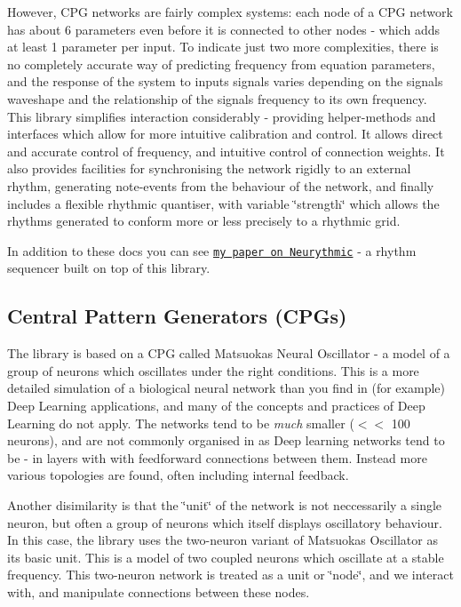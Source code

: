 However, C\+PG networks are fairly complex systems\+: each node of a C\+PG network has about 6 parameters even before it is connected to other nodes -\/ which adds at least 1 parameter per input. To indicate just two more complexities, there is no completely accurate way of predicting frequency from equation parameters, and the response of the system to inputs signals varies depending on the signal\textquotesingle{}s waveshape and the relationship of the signal\textquotesingle{}s frequency to its own frequency. ~\newline
 This library simplifies interaction considerably -\/ providing helper-\/methods and interfaces which allow for more intuitive calibration and control. It allows direct and accurate control of frequency, and intuitive control of connection weights. It also provides facilities for synchronising the network rigidly to an external rhythm, generating note-\/events from the behaviour of the network, and finally includes a flexible rhythmic quantiser, with variable \char`\"{}strength\char`\"{} which allows the rhythms generated to conform more or less precisely to a rhythmic grid.

In addition to these docs you can see \href{http://www.nime.org/proceedings/2018/nime2018_paper0047.pdf}{\tt my paper on Neurythmic} -\/ a rhythm sequencer built on top of this library.

\subsection*{Central Pattern Generators (C\+P\+Gs)}

The library is based on a C\+PG called Matsuoka\textquotesingle{}s Neural Oscillator -\/ a model of a group of neurons which oscillates under the right conditions. This is a more detailed simulation of a biological neural network than you find in (for example) Deep Learning applications, and many of the concepts and practices of Deep Learning do not apply. The networks tend to be {\itshape much} smaller ($<$$<$ 100 neurons), and are not commonly organised in as Deep learning networks tend to be -\/ in layers with with feedforward connections between them. Instead more various topologies are found, often including internal feedback.

Another disimilarity is that the \char`\"{}unit\char`\"{} of the network is not neccessarily a single neuron, but often a group of neurons which itself displays oscillatory behaviour. In this case, the library uses the two-\/neuron variant of Matsuoka\textquotesingle{}s Oscillator as its basic unit. This is a model of two coupled neurons which oscillate at a stable frequency. This two-\/neuron network is treated as a unit or \char`\"{}node\char`\"{}, and we interact with, and manipulate connections between these nodes.

